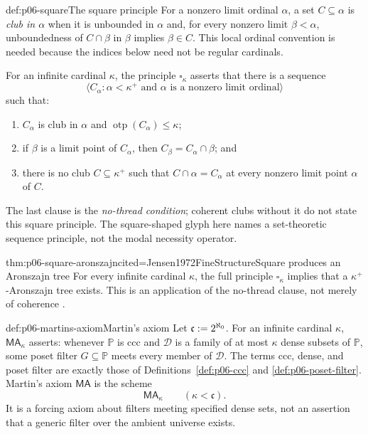 \begin{hbdefinition}{def:p06-square}{The square principle}
For a nonzero limit ordinal \(\alpha\), a set \(C\subseteq\alpha\) is
\emph{club in \(\alpha\)} when it is unbounded in \(\alpha\) and, for every
nonzero limit \(\beta<\alpha\), unboundedness of \(C\cap\beta\) in \(\beta\)
implies \(\beta\in C\).  This local ordinal convention is needed because the
indices below need not be regular cardinals.

For an infinite cardinal \(\kappa\), the principle \(\square_\kappa\)
asserts that there is a sequence
\[
  \langle C_\alpha:
  \alpha<\kappa^+\text{ and }\alpha\text{ is a nonzero limit ordinal}\rangle
\]
such that:
\begin{enumerate}
  \item \(C_\alpha\) is club in \(\alpha\) and
        \(\operatorname{otp}(C_\alpha)\leq\kappa\);
  \item if \(\beta\) is a limit point of \(C_\alpha\), then
        \(C_\beta=C_\alpha\cap\beta\); and
  \item there is no club \(C\subseteq\kappa^+\) such that
        \(C\cap\alpha=C_\alpha\) at every nonzero limit point
        \(\alpha\) of \(C\).
\end{enumerate}
The last clause is the \emph{no-thread condition}; coherent clubs without it
do not state this square principle.  The square-shaped glyph here names a
set-theoretic sequence principle, not the modal necessity operator.
\end{hbdefinition}

\begin{hbtheorem}{thm:p06-square-aronszajn}{cited=Jensen1972FineStructure}{Square produces an Aronszajn tree}
For every infinite cardinal \(\kappa\), the full principle
\(\square_\kappa\) implies that a \(\kappa^+\)-Aronszajn tree exists.  This
is an application of the no-thread clause, not merely of coherence
\cite{Jensen1972FineStructure}.
\end{hbtheorem}

\begin{hbdefinition}{def:p06-martins-axiom}{Martin's axiom}
Let \(\mathfrak c\mathrel{:=}2^{\aleph_0}\).  For an infinite cardinal \(\kappa\),
\(\mathsf{MA}_\kappa\) asserts: whenever \(\mathbb P\) is ccc and
\(\mathcal D\) is a family of at most \(\kappa\) dense subsets of
\(\mathbb P\), some poset filter \(G\subseteq\mathbb P\) meets every member
of \(\mathcal D\).  The terms ccc, dense, and poset filter are exactly those
of Definitions~\ref{def:p06-ccc} and \ref{def:p06-poset-filter}.
Martin's axiom \(\mathsf{MA}\) is the scheme
\[
  \mathsf{MA}_\kappa\qquad(\kappa<\mathfrak c).
\]
It is a forcing axiom about filters meeting specified dense sets, not an
assertion that a generic filter over the ambient universe exists.
\end{hbdefinition}

